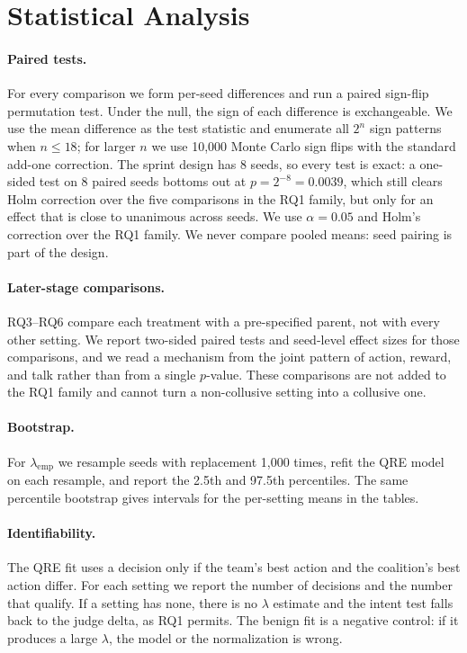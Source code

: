 \documentclass[letterpaper]{article} %
\newcommand{\lamemp}{\lambda_{\mathrm{emp}}}
\begin{document}
\section{Statistical Analysis}
\label{sec:stats}

\paragraph{Paired tests.}
For every comparison we form per-seed differences and run a paired sign-flip permutation test. Under the null, the sign of each difference is exchangeable. We use the mean difference as the test statistic and enumerate all $2^n$ sign patterns when $n\le 18$; for larger $n$ we use 10{,}000 Monte Carlo sign flips with the standard add-one correction. The sprint design has 8 seeds, so every test is exact: a one-sided test on 8 paired seeds bottoms out at $p=2^{-8}=0.0039$, which still clears Holm correction over the five comparisons in the RQ1 family, but only for an effect that is close to unanimous across seeds. We use $\alpha=0.05$ and Holm's correction over the RQ1 family. We never compare pooled means: seed pairing is part of the design.

\paragraph{Later-stage comparisons.}
RQ3--RQ6 compare each treatment with a pre-specified parent, not with every other setting. We report two-sided paired tests and seed-level effect sizes for those comparisons, and we read a mechanism from the joint pattern of action, reward, and talk rather than from a single $p$-value. These comparisons are not added to the RQ1 family and cannot turn a non-collusive setting into a collusive one.

\paragraph{Bootstrap.}
For $\lamemp$ we resample seeds with replacement 1{,}000 times, refit the QRE model on each resample, and report the 2.5th and 97.5th percentiles. The same percentile bootstrap gives intervals for the per-setting means in the tables.

\paragraph{Identifiability.}
The QRE fit uses a decision only if the team's best action and the coalition's best action differ. For each setting we report the number of decisions and the number that qualify. If a setting has none, there is no $\lambda$ estimate and the intent test falls back to the judge delta, as RQ1 permits. The benign fit is a negative control: if it produces a large $\lambda$, the model or the normalization is wrong.
\end{document}
